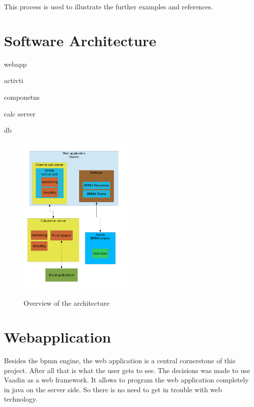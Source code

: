 \documentclass[paper=a4,twoside=false,BCOR=0mm,DIV=calc,fontsize=12pt]{scrartcl}
\begin{document}
This process is used to illustrate the further examples and references.





\section{Software Architecture}

webapp

activti 

componetns

calc server

db

\begin{figure}
    \begin{center}
      \includegraphics[width=0.5\textwidth]{./img/ArchitectrueOverview.pdf}\\
    \end{center}
  \caption{Overview of the architecture}
  \label{architectureoverview}
\end{figure} 


\section{Webapplication}
Besides the bpmn engine, the web application is a central cornerstone of this project. After all that is what the user gets to see.
The decisions was made to use Vaadin as a web framework. It allows to program the web application completely in java on the server side. So there is
no need to get in trouble with web technology.
\end{document}
